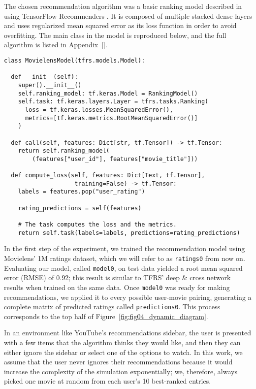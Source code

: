 The chosen recommendation algorithm was a basic ranking model described in
\citet{} using TensorFlow Recommenders \citep{noauthor_tensorflow_nodate}. It is %
composed of multiple stacked dense layers and uses regularized mean squared
error as its loss function in order to avoid overfitting. The main class in the
model is reproduced below, and the full algorithm is listed in Appendix~\ref{}.


\begin{verbatim}
class MovielensModel(tfrs.models.Model):

  def __init__(self):
    super().__init__()
    self.ranking_model: tf.keras.Model = RankingModel()
    self.task: tf.keras.layers.Layer = tfrs.tasks.Ranking(
      loss = tf.keras.losses.MeanSquaredError(),
      metrics=[tf.keras.metrics.RootMeanSquaredError()]
    )

  def call(self, features: Dict[str, tf.Tensor]) -> tf.Tensor:
    return self.ranking_model(
        (features["user_id"], features["movie_title"]))

  def compute_loss(self, features: Dict[Text, tf.Tensor],
                    training=False) -> tf.Tensor:
    labels = features.pop("user_rating")

    rating_predictions = self(features)

    # The task computes the loss and the metrics.
    return self.task(labels=labels, predictions=rating_predictions)
\end{verbatim}

In the first step of the experiment, we trained the recommendation model using
Movielens' 1M ratings dataset, which we will refer to as \verb|ratings0| from
now on. Evaluating our model, called \verb|model0|, on test data yielded a root
mean squared error (RMSE) of 0.92; this result is similar to TFRS' deep \& cross
network \citep{} results when trained on the same data. Once \verb|model0| was %
ready for making recommendations, we applied it to every possible user-movie
pairing, generating a complete matrix of predicted ratings called
\verb|predictions0|. This process corresponds to the top half of
Figure~\ref{fig:fig04_dynamic_diagram}.

In an environment like YouTube's recommendations sidebar, the user is presented
with a few items that the algorithm thinks they would like, and then they can
either ignore the sidebar or select one of the options to watch. In this work,
we assume that the user never ignores their recommendations because it would
increase the complexity of the simulation exponentially; we, therefore, always
picked one movie at random from each user's 10 best-ranked entries.

